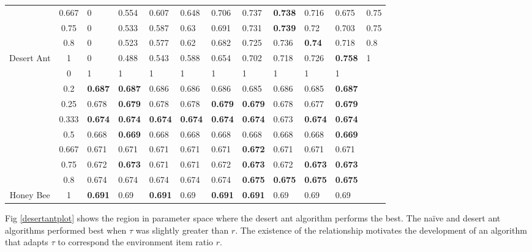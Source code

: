 \begin{table} [h]
\begin{tabular}{|c|c||l|l|l|l|l|l|l|l|l||l|}
&    0.667                & 0 & 0.554 & 0.607 & 0.648 & 0.706 & 0.737 & \textbf{0.738} & 0.716 & 0.675 & 0.75\\
&    0.75                 & 0 & 0.533 & 0.587 & 0.63  & 0.691 & 0.731 & \textbf{0.739} & 0.72  & 0.703  & 0.75 \\
&    0.8                  & 0 & 0.523 & 0.577 & 0.62  & 0.682 & 0.725 & 0.736 & \textbf{0.74}  & 0.718 & 0.8\\
\multirow{-9}{*}{Desert Ant}&    1                    & 0 & 0.488 & 0.543 & 0.588 & 0.654 & 0.702 & 0.718 & 0.726 & \textbf{0.758} & 1\\ \hline
&        0  & 1     & 1     & 1     & 1     & 1     & 1     & 1     & 1     & 1  &   \\
&    0.2                  & \textbf{0.687} &\textbf{0.687} & 0.686 & 0.686 & 0.686 & 0.685 & 0.686 & 0.685 & \textbf{0.687} &\\
&    0.25                 & 0.678 & \textbf{0.679} & 0.678 & 0.678 &\textbf{0.679} & \textbf{0.679} & 0.678 & 0.677 & \textbf{0.679} &\\
&    0.333                & \textbf{0.674} & \textbf{0.674} & \textbf{0.674} & \textbf{0.674} & \textbf{0.674} & \textbf{0.674} & 0.673 & \textbf{0.674} &\textbf{0.674} &\\
&    0.5                  & 0.668 & \textbf{0.669} & 0.668 & 0.668 & 0.668 & 0.668 & 0.668 & 0.668 & \textbf{0.669} &\\
&    0.667                & 0.671 & 0.671 & 0.671 & 0.671 & 0.671 & \textbf{0.672} & 0.671 & 0.671 & 0.671 &\\
&    0.75                 & 0.672 & \textbf{0.673} & 0.671 & 0.671 & 0.672 &\textbf{0.673} & 0.672 & \textbf{0.673} & \textbf{0.673}&\\
&    0.8                  & 0.674 & 0.674 & 0.674 & 0.674 & 0.674 & \textbf{0.675} &  \textbf{0.675} &  \textbf{0.675} & \textbf{0.675}& \\
\multirow{-9}{*}{Honey Bee}&    1                    & \textbf{0.691} & 0.69  & \textbf{0.691} & 0.69  & \textbf{0.691} &  \textbf{0.691}& 0.69  & 0.69  & 0.69  &\\ \hline

    \end{tabular}

\end{table}

Fig \ref{desertantplot} shows the region in parameter space where the desert ant algorithm performs the best. The na\"ive and desert ant algorithms performed best when $\tau$ was slightly greater than $r$. The existence of the relationship motivates the development of an algorithm that adapts $\tau$ to correspond the environment item ratio $r$.

